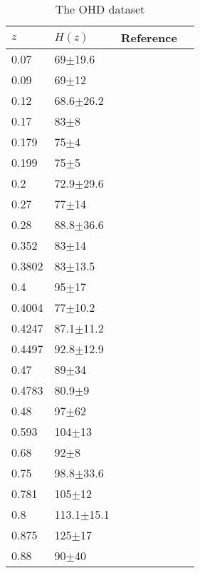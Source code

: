 \documentclass{aa}
\begin{document}
   \begin{table}[htbp]
      \caption{The OHD dataset}
      \centering
      \begin{tabular}{llll}
         \hline\hline
         $z$ & $H(z)$ & Reference \\
         \hline     
         0.07 & 69$\pm$19.6 & \cite{Zhang_2014} \\
         0.09 & 69$\pm$12 & \cite{PhysRevD.71.123001} \\
         0.12 & 68.6$\pm$26.2 & \cite{Zhang_2014} \\
         0.17 & 83$\pm$8 & \cite{PhysRevD.71.123001} \\
         0.179 & 75$\pm$4 & \cite{M.Moresco_2012} \\
         0.199 & 75$\pm$5 & \cite{M.Moresco_2012} \\
         0.2 & 72.9$\pm$29.6 & \cite{Zhang_2014} \\
         0.27 & 77$\pm$14 & \cite{PhysRevD.71.123001} \\
         0.28 & 88.8$\pm$36.6 & \cite{Zhang_2014} \\
         0.352 & 83$\pm$14 & \cite{M.Moresco_2012} \\
         0.3802 & 83$\pm$13.5 & \cite{Moresco_2016}  \\
         0.4 & 95$\pm$17 & \cite{PhysRevD.71.123001} \\
         0.4004 & 77$\pm$10.2 & \cite{Moresco_2016} \\
         0.4247 & 87.1$\pm$11.2 & \cite{Moresco_2016} \\
         0.4497 & 92.8$\pm$12.9 & \cite{Moresco_2016} \\
         0.47 & 89$\pm$34 & \cite{10.1093/mnras/stx301} \\
         0.4783 & 80.9$\pm$9 & \cite{Moresco_2016} \\
         0.48 & 97$\pm$62 & \cite{Daniel.Stern_2010} \\
         0.593 & 104$\pm$13 & \cite{M.Moresco_2012} \\
         0.68 & 92$\pm$8 & \cite{M.Moresco_2012} \\
         0.75 & 98.8$\pm$33.6 & \cite{Borghi_2022} \\
         0.781 & 105$\pm$12 & \cite{M.Moresco_2012} \\
         0.8 & 113.1$\pm$15.1 & \cite{Jiao_2023} \\
         0.875 & 125$\pm$17 & \cite{M.Moresco_2012} \\
         0.88 & 90$\pm$40 & \cite{Daniel.Stern_2010} \\

\end{tabular}
\end{table}
\end{document}
